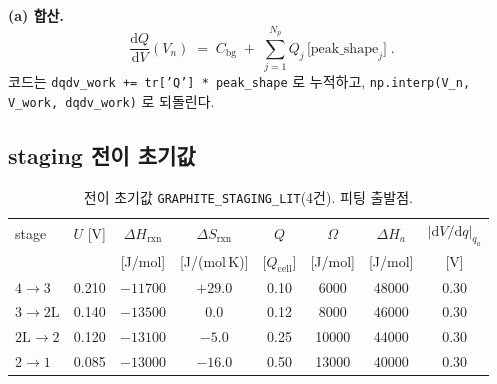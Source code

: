 \documentclass[11pt,a4paper]{article}
\newcommand{\dd}{\mathrm{d}}
\newcommand{\cell}{\mathrm{cell}}
\newcommand{\bg}{\mathrm{bg}}
\newcommand{\rxn}{\mathrm{rxn}}
\newcommand{\code}[1]{\texttt{#1}}
\begin{document}
\textbf{(a) 합산.}
\begin{equation}
\boxed{\;\frac{\dd Q}{\dd V}(V_n)\;=\;C_\bg\;+\;\sum_{j=1}^{N_p}Q_j\,
\bigl[\text{peak\_shape}_j\bigr]\;.}
\label{eq:sum}
\end{equation}
코드는 \code{dqdv\_work += tr['Q'] * peak\_shape} 로 누적하고,
\code{np.interp(V\_n, V\_work, dqdv\_work)} 로 되돌린다.

\subsection{staging 전이 초기값}
\begin{table}[t]
\centering
\renewcommand{\arraystretch}{1.25}
\caption{전이 초기값 \code{GRAPHITE\_STAGING\_LIT}(4건). 피팅 출발점.}
\label{tab:staging}
\begin{tabular}{l c c c c c c c}
\toprule
stage & $U$ [V] & $\Delta H_\rxn$ & $\Delta S_\rxn$ & $Q$ & $\Omega$ & $\Delta H_a$ & $|\dd V/\dd q|_{q_a}$ \\
 &  & [J/mol] & [J/(mol\,K)] & [$Q_\cell$] & [J/mol] & [J/mol] & [V] \\
\midrule
$4\!\to\!3$   & 0.210 & $-11700$ & $+29.0$ & 0.10 & 6000  & 48000 & 0.30 \\
$3\!\to\!2\mathrm L$ & 0.140 & $-13500$ & $0.0$   & 0.12 & 8000  & 46000 & 0.30 \\
$2\mathrm L\!\to\!2$ & 0.120 & $-13100$ & $-5.0$  & 0.25 & 10000 & 44000 & 0.30 \\
$2\!\to\!1$   & 0.085 & $-13000$ & $-16.0$ & 0.50 & 13000 & 40000 & 0.30 \\
\bottomrule
\end{tabular}
\end{table}
\end{document}
